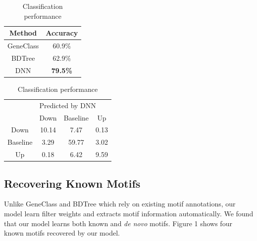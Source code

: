 \documentclass{article}
\begin{document}
\begin{table}[!hbt]
\caption{Classification performance}
\centering
 \begin{tabular}{|c | c|} 
 \hline
 Method & Accuracy \\
 \hline
 GeneClass & 60.9\% \\ 
 \hline
 BDTree & 62.9\% \\
 \hline
 DNN & \textbf{79.5\%} \\
 \hline
\end{tabular}
\quad
\centering
 \begin{tabular}{|c | c c c|} 
 \hline
 {} & \multicolumn{3}{|l|}{Predicted by DNN} \\
  & Down & Baseline & Up \\ 
 \hline
 Down & 10.14 & 7.47 & 0.13 \\
 \hline
 Baseline & 3.29 & 59.77 & 3.02 \\
 \hline
 Up & 0.18 & 6.42 & 9.59 \\
 \hline
\end{tabular}
\label{table:classification performance}
\end{table}

\subsection{Recovering Known Motifs}
Unlike GeneClass and BDTree which rely on existing motif annotations, our model learn filter weights and extracts motif information automatically.  We found that our model learns both known and \textit{de novo} motifs. Figure 1 shows four known motifs recovered by our model. 
\end{document}
